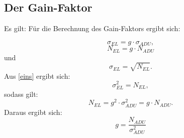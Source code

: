 \subsection{Der Gain-Faktor}Es gilt: 
Für die Berechnung des Gain-Faktors ergibt sich: \

\begin{equation}
\sigma_{EL} = g \cdot \sigma_{ADU}, 
\label{eins}
\end{equation}
\begin{equation}
N_{EL} = g \cdot N_{ADU}
\end{equation}
und 
\begin{equation}
\sigma_{EL} = \sqrt{N_{EL}}. 
\end{equation}
Aus \ref{eins} ergibt sich: 
\begin{equation}
\sigma_{EL}^2 = N_{EL}, 
\end{equation}
sodass gilt: 
\begin{equation}
N_{EL} = g^2 \cdot \sigma_{ADU}^2 = g \cdot N_{ADU}. 
\end{equation}
Daraus ergibt sich: 
\begin{equation}
g = \frac{N_{ADU}}{\sigma_{ADU}^2}
\end{equation}

